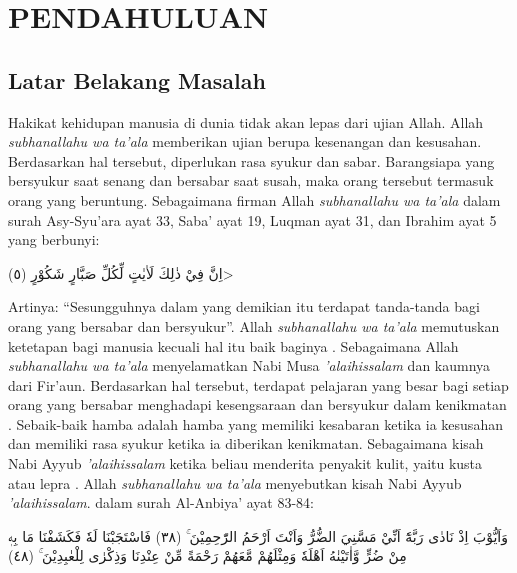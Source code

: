 \chapter{PENDAHULUAN}
    \section{Latar Belakang Masalah}

    Hakikat kehidupan manusia di dunia tidak akan lepas dari ujian Allah. Allah \textit{subhanallahu wa ta'ala} memberikan ujian berupa kesenangan dan kesusahan. Berdasarkan hal tersebut, diperlukan rasa syukur dan sabar. Barangsiapa yang bersyukur saat senang dan bersabar saat susah, maka orang tersebut termasuk orang yang beruntung. Sebagaimana firman Allah \textit{subhanallahu wa ta'ala} dalam surah Asy-Syu’ara ayat 33, Saba’ ayat 19, Luqman ayat 31, dan Ibrahim ayat 5 yang berbunyi:

    \begin{flushright}
        \<اِنَّ فِيْ ذٰلِكَ لَاٰيٰتٍ لِّكُلِّ صَبَّارٍ شَكُوْرٍ (٥)>
    \end{flushright}

    Artinya: “Sesungguhnya dalam yang demikian itu terdapat tanda-tanda bagi orang yang bersabar dan bersyukur”. Allah \textit{subhanallahu wa ta'ala} memutuskan ketetapan bagi manusia kecuali hal itu baik baginya \citep{Ramdhan2019}. Sebagaimana Allah \textit{subhanallahu wa ta'ala} menyelamatkan Nabi Musa \textit{'alaihissalam} dan kaumnya dari Fir’aun. Berdasarkan hal tersebut, terdapat pelajaran yang besar bagi setiap orang yang bersabar menghadapi kesengsaraan dan bersyukur dalam kenikmatan \citep{Muaziroh2018}. Sebaik-baik hamba adalah hamba yang memiliki kesabaran ketika ia kesusahan dan memiliki rasa syukur ketika ia diberikan kenikmatan. Sebagaimana kisah Nabi Ayyub \textit{'alaihissalam} ketika beliau menderita penyakit kulit, yaitu kusta atau lepra \citep{Muaziroh2018}. Allah \textit{subhanallahu wa ta'ala} menyebutkan kisah Nabi Ayyub \textit{'alaihissalam}. dalam surah Al-Anbiya’ ayat 83-84:

    \begin{flushright}
        \begin{RLtext}
            وَاَيُّوْبَ اِذْ نَادٰى رَبَّهٗٓ اَنِّيْ مَسَّنِيَ الضُّرُّ وَاَنْتَ اَرْحَمُ الرّٰحِمِيْنَ ۚ (٣٨) فَاسْتَجَبْنَا لَهٗ فَكَشَفْنَا مَا بِهٖ مِنْ ضُرٍّ وَّاٰتَيْنٰهُ اَهْلَهٗ وَمِثْلَهُمْ مَّعَهُمْ رَحْمَةً مِّنْ عِنْدِنَا وَذِكْرٰى لِلْعٰبِدِيْنَ ۚ (٤٨)
        \end{RLtext}
    \end{flushright}

